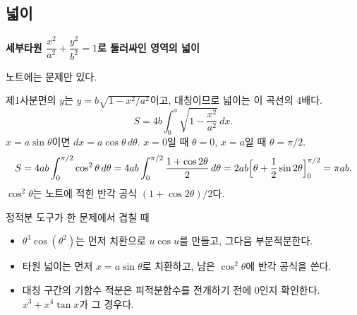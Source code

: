 \documentclass[11pt]{article}
\newcommand{\ex}[1]{\par\textbf{세부\quad #1}\par}
\begin{document}
\subsection{넓이}

\ex{타원 \(\dfrac{x^{2}}{a^{2}}+\dfrac{y^{2}}{b^{2}}=1\)로 둘러싸인 영역의 넓이}
노트에는 문제만 있다.

\begin{fillbox}
제1사분면의 \(y\)는 \(y=b\sqrt{1-x^{2}/a^{2}}\)이고, 대칭이므로 넓이는 이 곡선의 4배다.
\[
S=4b\int_{0}^{a}\sqrt{1-\frac{x^{2}}{a^{2}}}\,dx.
\]
\(x=a\sin\theta\)이면 \(dx=a\cos\theta\,d\theta\). \(x=0\)일 때 \(\theta=0\), \(x=a\)일 때 \(\theta=\pi/2\).
\[
S=4ab\int_{0}^{\pi/2}\cos^{2}\theta\,d\theta
=4ab\int_{0}^{\pi/2}\frac{1+\cos 2\theta}{2}\,d\theta
=2ab\Bigl[\theta+\frac12\sin 2\theta\Bigr]_{0}^{\pi/2}
=\pi ab.
\]
\(\cos^{2}\theta\)는 노트에 적힌 반각 공식 \((1+\cos 2\theta)/2\)다.
\end{fillbox}

\begin{relbox}{정적분 도구가 한 문제에서 겹칠 때}
\begin{itemize}
\item \(\theta^{3}\cos(\theta^{2})\)는 먼저 치환으로 \(u\cos u\)를 만들고, 그다음 부분적분한다.
\item 타원 넓이는 먼저 \(x=a\sin\theta\)로 치환하고, 남은 \(\cos^{2}\theta\)에 반각 공식을 쓴다.
\item 대칭 구간의 기함수 적분은 피적분함수를 전개하기 전에 \(0\)인지 확인한다. \(x^{3}+x^{4}\tan x\)가 그 경우다.
\end{itemize}
\end{relbox}
\end{document}
